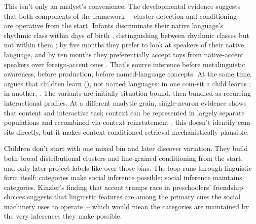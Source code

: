 This isn't only an analyst's convenience. The developmental evidence suggests that both components of the framework~-- cluster detection and conditioning~-- are operative from the start. Infants discriminate their native language's rhythmic class within days of birth \citep{mehler1988}, distinguishing between rhythmic classes but not within them \citep{nazzi1998}; by five months they prefer to look at speakers of their native language, and by ten months they preferentially accept toys from native-accent speakers over foreign-accent ones \citep{kinzler2007}. That's source inference before metalinguistic awareness, before production, before named-language concepts. At the same time, \textcite{wiese2023} argues that children learn  (), not named languages: in one com-sit a child learns ; in another, . The variants are initially situation-bound, then bundled as recurring interactional profiles. At a different analytic grain, single-neuron evidence shows that content and interactive task context can be represented in largely separate populations and recombined via context reinstatement \parencite{bausch2026}; this doesn't identify com-sits directly, but it makes context-conditioned retrieval mechanistically plausible.

Children don't start with one mixed bin and later discover variation. They build both broad distributional clusters and fine-grained conditioning from the start, and only later project labels like  over those bins. The loop runs through linguistic form itself: categories make social inference possible; social inference maintains categories. Kinzler's finding that accent trumps race in preschoolers' friendship choices suggests that linguistic features are among the primary cues the social machinery uses to operate~-- which would mean the categories are maintained by the very inferences they make possible.

